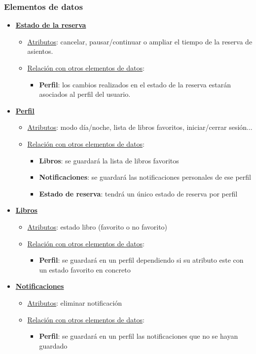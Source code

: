 \documentclass[12pt]{article}
\begin{document}
\subsubsection{Elementos de datos}
\begin{itemize}

\item \textbf{\underline{Estado de la reserva}}
\begin{itemize}
\item \underline{Atributos}: cancelar, pausar/continuar o ampliar el tiempo de la reserva de 
       asientos.
\item \underline{Relación con otros elementos de datos}:
\begin{itemize}
\item \textbf{Perfil}: los cambios realizados en el estado de la reserva estarán asociados al perfil del usuario.
\end{itemize}
\end{itemize}
\item \textbf{\underline{Perfil}}
\begin{itemize}
\item \underline{Atributos}: modo día/noche, lista de libros favoritos, iniciar/cerrar sesión...
\item \underline{Relación con otros elementos de datos}: 
\begin{itemize}
\item \textbf{Libros}: se guardará la lista de libros favoritos
\item \textbf{Notificaciones}: se guardará las notificaciones personales de ese perfil
\item \textbf{Estado de reserva}: tendrá un único estado de reserva por perfil
\end{itemize}
\end{itemize}
\item \textbf{\underline{Libros}}
\begin{itemize}
\item \underline{Atributos}: estado libro (favorito o no favorito)
\item \underline{Relación con otros elementos de datos}:
\begin{itemize}
\item \textbf{Perfil}: se guardará en un perfil dependiendo si su atributo este con un estado favorito en concreto
\end{itemize}
\end{itemize}
\item \textbf{\underline{Notificaciones}}
\begin{itemize}
\item \underline{Atributos}: eliminar notificación
\item \underline{Relación con otros elementos de datos}: 
\begin{itemize}
\item \textbf{Perfil}: se guardará en un perfil las notificaciones que no se hayan guardado
\end{itemize}
\end{itemize}
\end{itemize}
\end{document}
